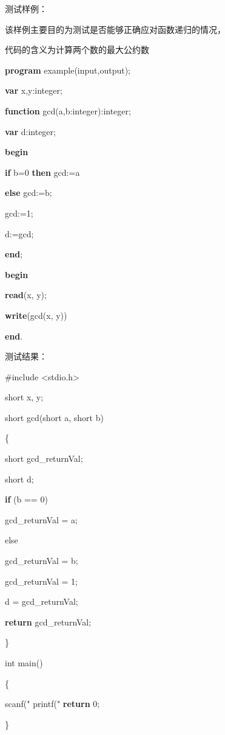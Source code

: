 \documentclass[]{ctexart}
\newenvironment{Shaded}{}{}
\newcommand{\ControlFlowTok}[1]{\textcolor[rgb]{0.00,0.44,0.13}{\textbf{#1}}}
\newcommand{\DataTypeTok}[1]{\textcolor[rgb]{0.56,0.13,0.00}{#1}}
\newcommand{\DecValTok}[1]{\textcolor[rgb]{0.25,0.63,0.44}{#1}}
\newcommand{\ImportTok}[1]{#1}
\newcommand{\KeywordTok}[1]{\textcolor[rgb]{0.00,0.44,0.13}{\textbf{#1}}}
\newcommand{\NormalTok}[1]{#1}
\newcommand{\PreprocessorTok}[1]{\textcolor[rgb]{0.74,0.48,0.00}{#1}}
\newcommand{\StringTok}[1]{\textcolor[rgb]{0.25,0.44,0.63}{#1}}
\begin{document}
测试样例：

该样例主要目的为测试是否能够正确应对函数递归的情况，

代码的含义为计算两个数的最大公约数

\begin{Shaded}
\begin{Highlighting}[]
\KeywordTok{program}\NormalTok{ example(input,output);
}
    \KeywordTok{var}\NormalTok{ x,y:}\DataTypeTok{integer}\NormalTok{;
}
    \KeywordTok{function}\NormalTok{ gcd(a,b:}\DataTypeTok{integer}\NormalTok{):}\DataTypeTok{integer}\NormalTok{;
}
    \KeywordTok{var}\NormalTok{ d:}\DataTypeTok{integer}\NormalTok{;
}
        \KeywordTok{begin} 

            \KeywordTok{if}\NormalTok{ b=}\DecValTok{0} \KeywordTok{then}\NormalTok{ gcd:=a
}
            \KeywordTok{else}\NormalTok{ gcd:=b;
}
\NormalTok{            gcd:=}\DecValTok{1}\NormalTok{;
}
\NormalTok{            d:=gcd;
}
        \KeywordTok{end}\NormalTok{;
}
    \KeywordTok{begin}

        \KeywordTok{read}\NormalTok{(x, y);
}
        \KeywordTok{write}\NormalTok{(gcd(x, y))
}
    \KeywordTok{end}\NormalTok{.}
\end{Highlighting}
\end{Shaded}

测试结果：

\begin{Shaded}
\begin{Highlighting}[]
\PreprocessorTok{#include }\ImportTok{<stdio.h>}\PreprocessorTok{
}


\DataTypeTok{short}\NormalTok{ x, y;
}
\DataTypeTok{short}\NormalTok{ gcd(}\DataTypeTok{short}\NormalTok{ a, }\DataTypeTok{short}\NormalTok{ b)
}
\NormalTok{\{
}
    \DataTypeTok{short}\NormalTok{ gcd_returnVal;
}
    \DataTypeTok{short}\NormalTok{ d;
}
    \ControlFlowTok{if}\NormalTok{ (b == }\DecValTok{0}\NormalTok{)
}
\NormalTok{        gcd_returnVal = a;
}
\NormalTok{    else
}
\NormalTok{        gcd_returnVal = b;
}
\NormalTok{    gcd_returnVal = }\DecValTok{1}\NormalTok{;
}
\NormalTok{    d = gcd_returnVal;
}
    \ControlFlowTok{return}\NormalTok{ gcd_returnVal;
}
\NormalTok{\}
}
\DataTypeTok{int}\NormalTok{ main()
}
\NormalTok{\{
}
\NormalTok{    scanf(}\StringTok{"%hd %hd"}\NormalTok{, &x, &y);
}
\NormalTok{    printf(}\StringTok{"%hd"}\NormalTok{, gcd(x, y));
}
    \ControlFlowTok{return} \DecValTok{0}\NormalTok{;
}
\NormalTok{\}
}
\end{Highlighting}
\end{Shaded}
\end{document}
